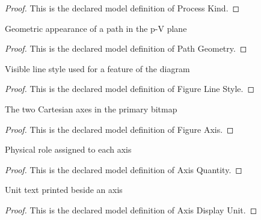\begin{proof}
  This is the declared model definition of Process Kind.
\end{proof}
\begin{definition}
  \label{def:physics:phyx-mini-0369:phyxminiproblems-problemphyxmini0369-pathgeometry}
  Geometric appearance of a path in the p-V plane
\end{definition}
\begin{proof}
  This is the declared model definition of Path Geometry.
\end{proof}
\begin{definition}
  \label{def:physics:phyx-mini-0369:phyxminiproblems-problemphyxmini0369-figurelinestyle}
  Visible line style used for a feature of the diagram
\end{definition}
\begin{proof}
  This is the declared model definition of Figure Line Style.
\end{proof}
\begin{definition}
  \label{def:physics:phyx-mini-0369:phyxminiproblems-problemphyxmini0369-figureaxis}
  The two Cartesian axes in the primary bitmap
\end{definition}
\begin{proof}
  This is the declared model definition of Figure Axis.
\end{proof}
\begin{definition}
  \label{def:physics:phyx-mini-0369:phyxminiproblems-problemphyxmini0369-axisquantity}
  Physical role assigned to each axis
\end{definition}
\begin{proof}
  This is the declared model definition of Axis Quantity.
\end{proof}
\begin{definition}
  \label{def:physics:phyx-mini-0369:phyxminiproblems-problemphyxmini0369-axisdisplayunit}
  Unit text printed beside an axis
\end{definition}
\begin{proof}
  This is the declared model definition of Axis Display Unit.
\end{proof}
